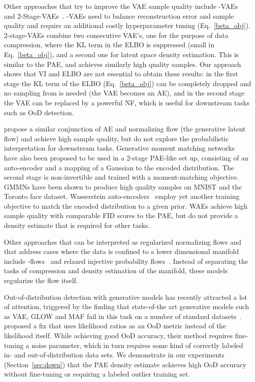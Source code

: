 \documentclass{article}
\begin{document}
Other approaches that try to improve the VAE sample quality include -VAEs~\citep {beta-VAE} and
2-Stage-VAEs~\citep{2StageVAE}. 
-VAEs need to balance reconstruction error and sample quality and require an additional costly hyperparameter tuning (Eq.~\ref{beta_obj}).  
2-stage-VAEs combine two consecutive VAE's, one for the purpose of data compression, where the KL term in the ELBO is suppressed (small  in Eq.~\ref{beta_obj}), and a second one for latent space density estimation. 
This is similar to the PAE, and 
achieves similarly high quality samples. Our approach shows 
that VI and ELBO are not essential to obtain these results: in the first stage the KL 
term of the ELBO (Eq.~\ref{beta_obj}) can be completely dropped and no sampling from  is needed (the VAE becomes an AE), and in the second stage the VAE can be replaced by a powerful NF, which is useful for downstream tasks such as OoD detection. 

\cite{GLF} propose a similar conjunction of AE and normalizing flow (the generative latent flow) and achieve high sample quality, but do 
not explore the probabilistic interpretation for downstream tasks. Generative moment matching networks~\citep{GMMN} have also been proposed to be used in a 2-stage PAE-like set up, consisting of an auto-encoder and a mapping of a Gaussian to the encoded distribution. The second stage is non-invertible and trained with a moment-matching objective. GMMNs have been shown to produce high quality samples on MNIST and the Toronto face dataset. Wasserstein auto-encoders~\citep{WAE} employ yet another training objective to match the encoded distribution to a given prior. WAEs achieve high sample quality with comparable FID scores to the PAE, but do not provide a density estimate that is required for other tasks.

Other approaches that can be interpreted as regularized normalizing flows and that address cases where the data is confined to a lower dimensional manifold include -flows~\citep{Brehmer2020} and relaxed injective probability flows~\citep{Kumar2020}. Instead of separating the tasks of compression and density estimation of the manifold, these models regularize the flow itself. 

Out-of-distribution detection with generative models has recently attracted a lot of attention, triggered by the finding that state-of-the art generative models such as VAE, GLOW and MAF fail in this task on a number of standard datasets~\citep{Nalisnick2019}. \citep{Nalisnick2019} proposed a fix that uses likelihood ratios as an OoD metric instead of the likelihood itself. While achieving good OoD accuracy, their method requires fine-tuning a noise parameter, which in turn requires some kind of correctly labeled in- and out-of-distribution data sets. We demonstrate in our experiments (Section~\ref{sec:down}) that the PAE density estimate achieves high OoD accuracy without fine-tuning or requiring a labeled outlier training set.
\end{document}

